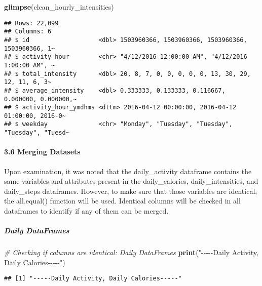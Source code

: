 \documentclass[
]{article}
\newenvironment{Shaded}{\begin{snugshade}}{\end{snugshade}}
\newcommand{\CommentTok}[1]{\textcolor[rgb]{0.56,0.35,0.01}{\textit{#1}}}
\newcommand{\ControlFlowTok}[1]{\textcolor[rgb]{0.13,0.29,0.53}{\textbf{#1}}}
\newcommand{\DecValTok}[1]{\textcolor[rgb]{0.00,0.00,0.81}{#1}}
\newcommand{\FunctionTok}[1]{\textcolor[rgb]{0.13,0.29,0.53}{\textbf{#1}}}
\newcommand{\NormalTok}[1]{#1}
\newcommand{\SpecialCharTok}[1]{\textcolor[rgb]{0.81,0.36,0.00}{\textbf{#1}}}
\newcommand{\StringTok}[1]{\textcolor[rgb]{0.31,0.60,0.02}{#1}}
\begin{document}
\begin{Shaded}
\begin{Highlighting}[]
\FunctionTok{glimpse}\NormalTok{(clean\_hourly\_intensities)}
\end{Highlighting}
\end{Shaded}

\begin{verbatim}
## Rows: 22,099
## Columns: 6
## $ id                   <dbl> 1503960366, 1503960366, 1503960366, 1503960366, 1~
## $ activity_hour        <chr> "4/12/2016 12:00:00 AM", "4/12/2016 1:00:00 AM", ~
## $ total_intensity      <dbl> 20, 8, 7, 0, 0, 0, 0, 0, 13, 30, 29, 12, 11, 6, 3~
## $ average_intensity    <dbl> 0.333333, 0.133333, 0.116667, 0.000000, 0.000000,~
## $ activity_hour_ymdhms <dttm> 2016-04-12 00:00:00, 2016-04-12 01:00:00, 2016-0~
## $ weekday              <chr> "Monday", "Tuesday", "Tuesday", "Tuesday", "Tuesd~
\end{verbatim}

\hypertarget{merging-datasets}{%
\paragraph{3.6 Merging Datasets}\label{merging-datasets}}

Upon examination, it was noted that the daily\_activity dataframe
contains the same variables and attributes present in the
daily\_calories, daily\_intensities, and daily\_steps dataframes.
However, to make sure that those variables are identical, the
all.equal() function will be used. Identical columns will be checked in
all dataframes to identify if any of them can be merged.

\hypertarget{daily-dataframes-6}{%
\subparagraph{Daily DataFrames}\label{daily-dataframes-6}}

\begin{Shaded}
\begin{Highlighting}[]
\CommentTok{\# Checking if columns are identical: Daily DataFrames}
\FunctionTok{print}\NormalTok{(}\StringTok{"{-}{-}{-}{-}{-}Daily Activity, Daily Calories{-}{-}{-}{-}{-}"}\NormalTok{)}
\end{Highlighting}
\end{Shaded}

\begin{verbatim}
## [1] "-----Daily Activity, Daily Calories-----"
\end{verbatim}

\begin{Shaded}
\end{Shaded}
\end{document}
